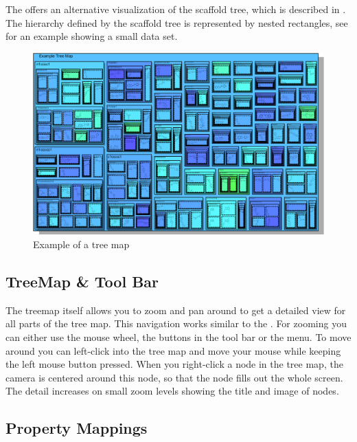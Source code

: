 The \tmview offers an alternative visualization of the scaffold tree, which is described in . The hierarchy defined by the scaffold tree is represented by nested rectangles, see  for an example showing a small data set.

%
\begin{figure}[!htb]
\begin{centering}
\includegraphics[width=0.8\columnwidth]{images/treemap/treemap_example}
\par\end{centering}

\caption{Example of a tree map}
\label{fig:treemap:example}

%
\end{figure}

\subsection{TreeMap \& Tool Bar}

The treemap itself allows you to zoom and pan around to get a detailed view for all parts of the tree map. This navigation works similar to the \stview. For zooming you can either use the mouse wheel, the buttons in the tool bar or the  menu. To move around you can left-click into the tree map and move your mouse while keeping the left mouse button pressed. When you right-click a node in the tree map, the camera is centered around this node, so that the node fills out the whole screen. The detail increases on small zoom levels showing the title and image of nodes.

\subsection{Property Mappings}\label{sec:treemap:propertymapping}

